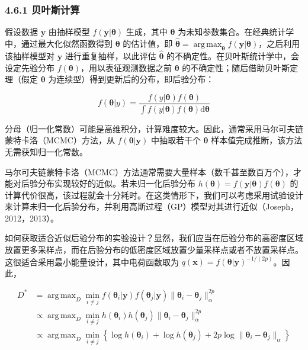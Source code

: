 \documentclass{ctexart}
\DeclareMathOperator*{\argmax}{arg\,max}
\begin{document}
\subsubsection*{4.6.1 贝叶斯计算}

假设数据 $\boldsymbol{y}$ 由抽样模型 $f(\boldsymbol{y}|\boldsymbol{\theta})$ 生成，其中 $\boldsymbol{\theta}$ 为未知参数集合。在经典统计学中，通过最大化似然函数得到 $\boldsymbol{\theta}$ 的估计值，即 $\widehat{\boldsymbol{\theta}} = \argmax_{\boldsymbol{\theta}} f(\boldsymbol{y}|\boldsymbol{\theta})$，之后利用该抽样模型对 $\boldsymbol{y}$ 进行重复抽样，以此评估 $\widehat{\boldsymbol{\theta}}$ 的不确定性。在贝叶斯统计学中，会设定先验分布 $f(\boldsymbol{\theta})$，用以表征观测数据之前 $\boldsymbol{\theta}$ 的不确定性；随后借助贝叶斯定理（假定 $\boldsymbol{\theta}$ 为连续型）得到更新后的分布，即后验分布：

\begin{equation*}
f(\boldsymbol{\theta}|y) = \frac{f(y|\boldsymbol{\theta})f(\boldsymbol{\theta})}{\int f(y|\boldsymbol{\theta})f(\boldsymbol{\theta})\mathrm{d}\boldsymbol{\theta}}
\end{equation*}

分母（归一化常数）可能是高维积分，计算难度较大。因此，通常采用马尔可夫链蒙特卡洛（MCMC）方法，从 $f(\boldsymbol{\theta}|\boldsymbol{y})$ 中抽取若干个 $\boldsymbol{\theta}$ 样本值完成推断，该方法无需获知归一化常数。

马尔可夫链蒙特卡洛（MCMC）方法通常需要大量样本（数千甚至数百万个），才能对后验分布实现较好的近似。若未归一化后验分布 $h(\boldsymbol{\theta})=f(\boldsymbol{y}|\boldsymbol{\theta})f(\boldsymbol{\theta})$ 的计算代价很高，该过程就会十分耗时。在这类情形下，我们可以考虑采用试验设计来计算未归一化后验分布，并利用高斯过程（GP）模型对其进行近似（Joseph，2012，2013）。

如何获取适合近似后验分布的实验设计？显然，我们应当在后验分布的高密度区域放置更多采样点，而在后验分布的低密度区域放置少量采样点或者不放置采样点。这很适合采用最小能量设计，其中电荷函数取为 $q(\boldsymbol{x}) = f(\boldsymbol{\theta}|\boldsymbol{y})^{-1/(2p)}$。因此，

\begin{align*}
D^* &= \argmax_{D}\min_{i\neq j} f(\boldsymbol{\theta}_i|\boldsymbol{y})f(\boldsymbol{\theta}_j|\boldsymbol{y})\|\boldsymbol{\theta}_i -\boldsymbol{\theta}_j\|^{2p}_\alpha \\
&\propto \argmax_{D}\min_{i\neq j} h(\boldsymbol{\theta}_i)h(\boldsymbol{\theta}_j)\|\boldsymbol{\theta}_i -\boldsymbol{\theta}_j\|^{2p}_\alpha \\
&\propto \argmax_{D}\min_{i\neq j} \left\{\log h(\boldsymbol{\theta}_i) + \log h(\boldsymbol{\theta}_j) + 2p\log \|\boldsymbol{\theta}_i -\boldsymbol{\theta}_j\|_\alpha\right\}
\tag{4.47}
\end{align*}
\end{document}
